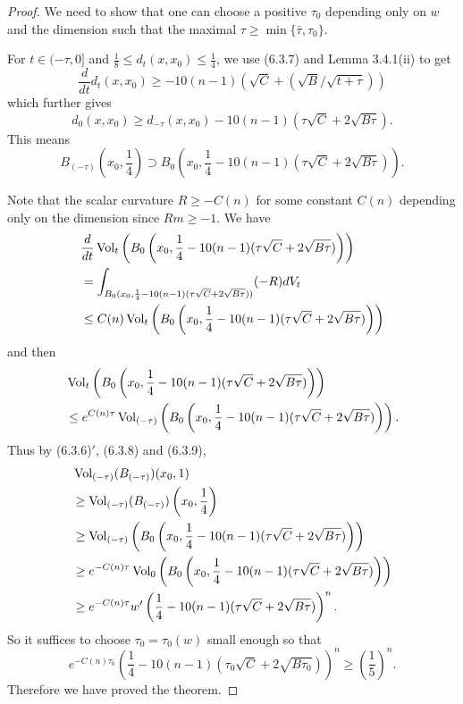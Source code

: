 \begin{proof}
We need to show that one can choose a positive $\tau_0$ depending
only on $w$ and the dimension such that the maximal $\tau \geq
\min \{\bar{\tau},\tau_0\}$.

For $t\in(-\tau,0]$ and $\frac{1}{8}\leq d_t(x,x_0)\leq
\frac{1}{4}$, we use (6.3.7) and Lemma 3.4.1(ii) to get
$$
\frac{d}{dt}d_t(x,x_0)\geq
-10(n-1)(\sqrt{C}+(\sqrt{B}/\sqrt{t+\tau}))
$$
which further gives
$$
d_0(x,x_0)\geq
d_{-\tau}(x,x_0)-10(n-1)(\tau\sqrt{C}+2\sqrt{B\tau}).
$$
This means \begin{equation} B_{(-\tau)}(x_0,\frac{1}{4})\supset
B_0\left(x_0,\frac{1}{4}-10(n-1)(\tau\sqrt{C}+2\sqrt{B\tau})\right).
\end{equation}

Note that the scalar curvature $R\geq -C(n)$ for some constant
$C(n)$ depending only on the dimension since $Rm\geq -1.$ We have
\begin{align*}
&\frac{d}{dt}\operatorname{Vol}_t\left(B_0\left(x_0,\frac{1}{4}
-10(n-1)(\tau\sqrt{C}+2\sqrt{B\tau})\right)\right)\\
&  = \int_{B_0(x_0,\frac{1}{4}-10(n-1)(\tau\sqrt{C}
+2\sqrt{B\tau}))}(-R)dV_t\\
&  \leq C(n)\operatorname{Vol}_t\left(B_0\left(x_0,\frac{1}{4}
-10(n-1)(\tau\sqrt{C}+2\sqrt{B\tau})\right)\right)
\end{align*}
and then
\begin{align}
&  \operatorname{Vol}_t\left(B_0\left(x_0,\frac{1}{4}-10(n-1)(\tau\sqrt{C}
+2\sqrt{B\tau})\right)\right)\\
& \leq e^{C(n)\tau}\operatorname{Vol}_{(-\tau)}\left(B_0\left(x_0,\frac{1}{4}
-10(n-1)(\tau\sqrt{C}+2\sqrt{B\tau})\right)\right).\nonumber
\end{align}  %
Thus by (6.3.6)$'$, (6.3.8) and (6.3.9),
\begin{align*}
& \operatorname{Vol}_{(-\tau)}(B_{(-\tau)})(x_0,1) \\
&  \geq \operatorname{Vol}_{(-\tau)}(B_{(-\tau)})\left(x_0,\frac{1}{4}\right)\\
&  \geq \operatorname{Vol}_{(-\tau)}\left(B_0\left(x_0,\frac{1}{4}-10(n-1)(\tau\sqrt{C}
+2\sqrt{B\tau})\right)\right)\\
&  \geq e^{-C(n)\tau}\operatorname{Vol}_{0}\left(B_0\left(x_0,\frac{1}{4}
-10(n-1)(\tau\sqrt{C}+2\sqrt{B\tau})\right)\right)\\
& \geq e^{-C(n)\tau}w'\left(\frac{1}{4}
-10(n-1)(\tau\sqrt{C}+2\sqrt{B\tau})\right)^n.
\end{align*}
So it suffices to choose $\tau_0=\tau_0(w)$ small enough so that
$$
e^{-C(n)\tau_0}\left(\frac{1}{4}-10(n-1)(\tau_0\sqrt{C}
+2\sqrt{B\tau_0})\right)^n\geq \left(\frac{1}{5}\right)^n.
$$
Therefore we have proved the theorem.
\end{proof}


